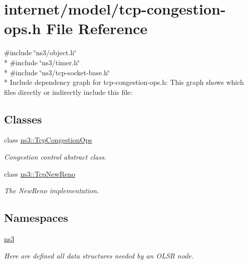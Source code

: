 \hypertarget{tcp-congestion-ops_8h}{}\section{internet/model/tcp-\/congestion-\/ops.h File Reference}
\label{tcp-congestion-ops_8h}
{\ttfamily \#include \char`\"{}ns3/object.\+h\char`\"{}}\\*
{\ttfamily \#include \char`\"{}ns3/timer.\+h\char`\"{}}\\*
{\ttfamily \#include \char`\"{}ns3/tcp-\/socket-\/base.\+h\char`\"{}}\\*
Include dependency graph for tcp-\/congestion-\/ops.h\+:
This graph shows which files directly or indirectly include this file\+:
\subsection*{Classes}
\begin{DoxyCompactItemize}
\item 
class \hyperlink{classns3_1_1TcpCongestionOps}{ns3\+::\+Tcp\+Congestion\+Ops}
\begin{DoxyCompactList}\small\item\em Congestion control abstract class. \end{DoxyCompactList}\item 
class \hyperlink{classns3_1_1TcpNewReno}{ns3\+::\+Tcp\+New\+Reno}
\begin{DoxyCompactList}\small\item\em The New\+Reno implementation. \end{DoxyCompactList}\end{DoxyCompactItemize}
\subsection*{Namespaces}
\begin{DoxyCompactItemize}
\item 
 \hyperlink{namespacens3}{ns3}
\begin{DoxyCompactList}\small\item\em Here are defined all data structures needed by an O\+L\+SR node. \end{DoxyCompactList}\end{DoxyCompactItemize}
